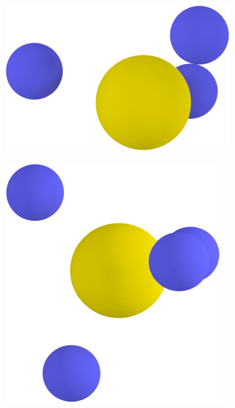 \begin{figure}[htpb]
\begin{subfigure}[c]{\myfigwidth}
        \caption{}%
        \label{fig:pass_tet02}%
    \end{subfigure}%
    \hspace{1cm}%
    \begin{subfigure}[c]{1.1\myfigwidth}%
        \includegraphics[width=\textwidth]{images/passivation/tetrahedra03_01.png}%
        \caption{}%
        \label{fig:pass_tet03}%
    \end{subfigure}%
    \hspace{1cm}%
    \begin{subfigure}[c]{1.1\myfigwidth}%
        \includegraphics[width=\textwidth]{images/passivation/tetrahedra04_01.png}%

\end{subfigure}
\end{figure}
